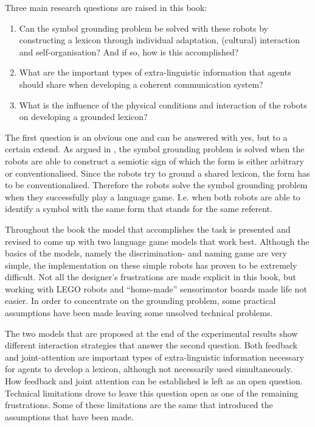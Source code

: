 Three main research questions are raised in this book:

\begin{enumerate}
\item Can the symbol grounding problem be solved with these robots by constructing a lexicon through individual adaptation, (cultural) interaction and self-organisation? And if so, how is this accomplished?
\item What are the important types of extra-linguistic information that agents should share when developing a coherent communication system?
\item What is the influence of the physical conditions and interaction of the robots on developing a grounded lexicon?
\end{enumerate}


The first question is an obvious one and can be answered with yes, but to a certain extend. As argued in , the symbol grounding problem is solved when the robots are able to construct a semiotic sign of which the form is either arbitrary or conventionalised. Since the robots try to ground a shared lexicon, the form has to be conventionalised. Therefore the robots solve the symbol grounding problem when they successfully play a language game. I.e. when both robots are able to identify a symbol with the same form that stands for the same referent. 

Throughout the book the model that accomplishes the task is presented and revised to come up with two language game models that work best. Although the basics of the models, namely the discrimination- and naming game are very simple, the implementation on these simple robots has proven to be extremely difficult. Not all the designer's frustrations are made explicit in this book, but working with LEGO robots and ``home-made'' sensorimotor boards made life not easier. In order to concentrate on the grounding problem, some practical assumptions have been made leaving some unsolved technical problems. 

The two models that are proposed at the end of the experimental results show different interaction strategies that answer the second question. Both feedback and joint-attention are important types of extra-linguistic information necessary for agents to develop a lexicon, although not necessarily used simultaneously. How feedback and joint attention can be established is left as an open question. Technical limitations drove to leave this question open as one of the remaining frustrations. Some of these limitations are the same that introduced the assumptions that have been made. 

